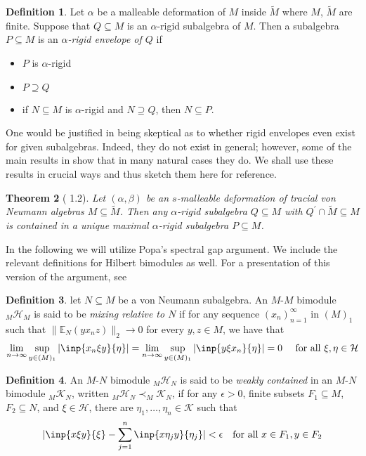 \documentclass[a4paper,11pt]{article}
\numberwithin{equation}{section}
\newtheorem{thm}{Theorem}[section]
\theoremstyle{definition}
\newtheorem{defn}[thm]{Definition}
\theoremstyle{remark}
\numberwithin{equation}{section}
\newcommand{\E}{\mathbb{E}}
\def\H{\mathcal H}
\def\K{\mathcal K}
\def\sub{\subseteq}
\providecommand{\norm}[1]{\lVert#1\rVert}
\numberwithin{equation}{section}
\begin{document}
\begin{defn}
  Let $ \alpha $ be a malleable deformation of $ M $ inside $ \widetilde{M} $ where $ M$, $\widetilde{M} $ are finite. Suppose that $ Q\sub M $ is an $ \alpha $-rigid subalgebra of $ M $. Then a subalgebra $ P\sub M $ is an \textit{$\alpha$-rigid envelope of $ Q $} if 
  \begin{itemize}
    \item $ P $ is $ \alpha $-rigid
    \item $ P\supseteq Q $
    \item if $ N \sub M $ is $ \alpha $-rigid and $ N\supseteq Q $, then $ N\sub P $.
  \end{itemize}
\end{defn}

One would be justified in being skeptical as to whether rigid envelopes even exist for given subalgebras. Indeed, they do not exist in general; however, some of the main results in \textcite{dSHH:21} show that in many natural cases they do. We shall use these results in crucial ways and thus sketch them here for reference.

\begin{thm}[\textcite{dSHH:21} 1.2] \label{rigenvelope}
  Let $ (\alpha,\beta) $ be an $ s $-malleable deformation of tracial von Neumann algebras $ M\sub \widetilde{M} $. Then any $ \alpha $-rigid subalgebra $ Q\sub M $ with $ Q^{\prime}\cap \widetilde{M}\sub M $ is contained in a unique maximal $ \alpha $-rigid subalgebra $ P\sub M $.
\end{thm}

In the following we will utilize Popa's spectral gap argument. We include the relevant definitions for Hilbert bimodules as well. For a presentation of this version of the argument, see \cite[Theorem 3.2]{hoff:16}

\begin{defn}
    let $ N\subseteq M $ be a von Neumann subalgebra. An $M$-$M$ bimodule $ _M \H_M $ is said to be \textit{mixing relative to $ N $} if for any sequence $ (x_{n})_{n=1}^{\infty} $ in $ (M)_{1} $ such that $ \norm{\E_{N}(yx_{n}z)}_{2} \to 0 $ for every $ y,z\in M $, we have that 
    \[
        \lim_{n\to \infty} \sup_{y\in(M)_{1}}|\inp{x_{n} \xi y}{\eta}| = \lim_{n\to \infty} \sup_{y\in(M)_{1}}|\inp{y \xi x_{n} }{\eta}| = 0 \quad \text{ for all } \xi,\eta\in \H
    \]

\end{defn}

\begin{defn}
    An $ M $-$ N $ bimodule $ _M\H_N $ is said to be \textit{weakly contained} in an $ M $-$ N $ bimodule $ _M\K_N $, written $ _M\H_N \prec _M\K_N$, if for any $ \epsilon>0 $, finite subsets $ F_{1} \sub M $, $ F_{2}\sub N $, and $ \xi\in \H $, there are $ \eta_{1},\ldots, \eta_{n}\in \K $ such that 
    \[
        |\inp{x \xi y}{\xi} - \sum_{j=1}^{n}\inp{x \eta_{j}y }{\eta_{j}} | < \epsilon \quad \text{for all } x\in F_{1}, y\in F_{2}
    \]

\end{defn}
\end{document}
